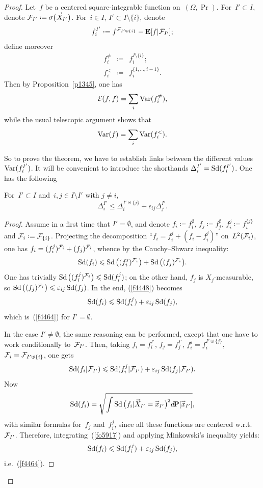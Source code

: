 \begin{proof}
Let~$f$ be a centered square-integrable function on~$(\Omega,\Pr)$.
For~$I' \subset I$, denote $\mcal{F}_{I'} \coloneqq \sigma\big(\vec{X}_{I'}\big)$.
For~$i\in I$, $I' \subset I\setminus\{i\}$,
denote
\[ f_i^{I'} \coloneqq f^{\mcal{F}_{I'\uplus\{i\}}} - \EE[f|\mcal{F}_{I'}] ;\]
define moreover
\begin{eqnarray}
f_i^{\neq} & \coloneqq & f_i^{I\setminus\{i\}} ; \\
f_i^{<}  & \coloneqq & f_i^{\{1,\ldots,i-1\}}.
\end{eqnarray}
%
Then by Proposition~\ref{p1345}, one has
\[ \mathcal{E}(f,f) = \sum_i \operatorname{Var}(f_i^{\neq}) ,\]
while the usual telescopic argument shows that
\[ \operatorname{Var}(f) = \sum_i \operatorname{Var}(f_i^<) .\]

So to prove the theorem, we have to establish links between
the different values $\operatorname{Var}(f_i^{I'})$.
It will be convenient to introduce the shorthands $\Delta_i^{I'} = \operatorname{Sd}(f_i^{I'})$.
One has the following
%
\begin{Clm}\label{l8326}
For~$I' \subset I$ and~$i,j\in I \setminus I'$ with $j\neq i$,
\[\label{f4464} \Delta_i^{I'} \leq \Delta_i^{I'\uplus\{j\}} + \epsilon_{ij} \Delta_j^{I'} .\]
\end{Clm}

\begin{proof}
Assume in a first time that $I'=\emptyset$,
and denote $f_i \coloneqq f_i^{\emptyset}$, $f_j \coloneqq f_j^{\emptyset}$, $f_i^j \coloneqq f_i^{\{j\}}$
and $\mcal{F}_i \coloneqq \mcal{F}_{\{i\}}$.
%
Projecting the decomposition ``$f_i = f_i^j + (f_i-f_i^j)$''
on~$L^2(\mathcal{F}_i)$, one has $f_i = (f_i^j)^{\mathcal{F}_i} + (f_j)^{\mathcal{F}_i}$,
whence by the Cauchy--Shwarz inequality:
\[\label{f4448}
\ecty(f_i) \leq \ecty\big((f^j_i)^{\mcal{F}_i}\big) + \ecty\big((f_j)^{\mcal{F}_i}\big) .\]
%
One has trivially
$\ecty\big((f^j_i)^{\mcal{F}_i}\big) \leq \ecty(f^j_i)$;
on the other hand, $f_j$ is $X_j$-measurable,
so $\ecty\big((f_j)^{\mcal{F}_i}\big) \leq \epsilon_{ij} \ecty(f_j)$.
In the end, (\ref{f4448}) becomes
\[ \operatorname{Sd}(f_i) \leqslant \operatorname{Sd}(f^j_i) + \varepsilon_{ij} \operatorname{Sd}(f_j) ,\]
which is~(\ref{f4464}) for $I' = \emptyset$.

In the case $I' \neq \emptyset$, the same reasoning can be performed, except that
one have to work conditionally to~$\mathcal{F}_{I'}$.
Then, taking
$f_i = f^{I'}_i$,
$f_j = f^{I'}_j$,
$f^j_i = f^{I'\uplus\{j\}}_i$,
$\mathcal{F}_i = \mathcal{F}_{I'\uplus\{i\}}$,
%
one gets
\[\label{fo5917}
\operatorname{Sd}(f_i|\mathcal{F}_{I'}) \leqslant \operatorname{Sd}(f^j_i|\mathcal{F}_{I'}) + \varepsilon_{ij} \operatorname{Sd}(f_j|\mathcal{F}_{I'}) .\]
Now
\[\ecty(f_i) = \sqrt{\int \ecty\big(f_i|\vec{X}_{I'}=\vec{x}_{I'}\big)^2 \dx\Pr[\vec{x}_{I'}]} ,\]
with similar formulas for~$f_j$ and~$f^j_i$, since all these functions
are centered w.r.t.~$\mathcal{F}_{I'}$.
%
Therefore, integrating~(\ref{fo5917}) and applying Minkowski's inequality yields:
\[ \operatorname{Sd}(f_i) \leqslant \operatorname{Sd}(f^j_i) + \varepsilon_{ij} \operatorname{Sd}(f_j) ,\]
i.e.~(\ref{f4464}).
\end{proof}


\end{proof}
